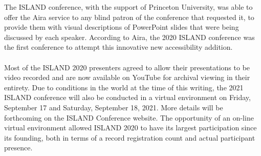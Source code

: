 \documentclass[11.5pt]{sig-alternate}
\begin{document}
\begin{large}
     The ISLAND conference, with the support of Princeton University, was able to offer the Aira service to any blind patron of the conference that requested it, to provide them with visual descriptions of PowerPoint slides that were being discussed by each speaker. According to Aira, the 2020 ISLAND conference was the first conference to attempt this innovative new accessibility addition.
\\
\\
     Most of the ISLAND 2020 presenters agreed to allow their presentations to be video recorded and are now available on YouTube for archival viewing in their entirety. Due to conditions in the world at the time of this writing, the 2021 ISLAND conference will also be conducted in a virtual environment on Friday, September 17 and Saturday, September 18, 2021. More details will be forthcoming on the ISLAND Conference website. The opportunity of an on-line virtual environment allowed ISLAND 2020 to have its largest participation since its founding, both in terms of a record registration count and actual participant presence.
\end{large}





\vspace{5mm}
\end{document}
